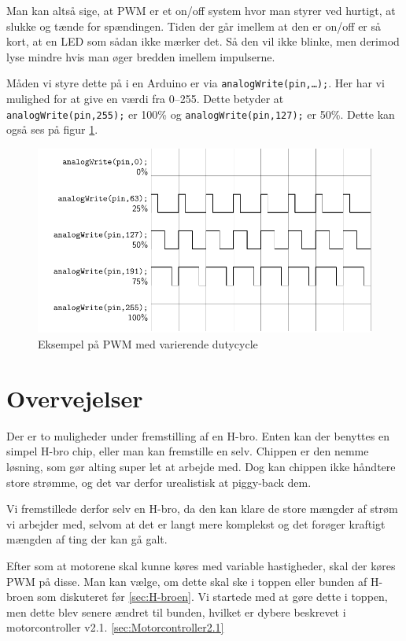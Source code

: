 \documentclass[a4paper,oneside,article,danish,table]{memoir}
\begin{document}
Man kan altså sige, at PWM er et on/off system hvor man styrer ved hurtigt, at slukke og tænde for
spændingen. Tiden der går imellem at den er on/off er så kort, at en LED som sådan ikke mærker det. Så
den vil ikke blinke, men derimod lyse mindre hvis man øger bredden imellem impulserne.

Måden vi styre dette på i en Arduino er via \texttt{analogWrite(pin,\dots);}. Her har vi mulighed for at give en værdi fra 0--255. Dette betyder at \texttt{analogWrite(pin,255);} er 100\% og \texttt{analogWrite(pin,127);} er 50\%. Dette kan også ses på figur \ref{fig:pwm}.
\begin{figure}[htbp]
  \centering
  \includegraphics[width=\textwidth]{pictures/pwm.pdf}
  \caption{Eksempel på PWM med varierende dutycycle}
  \label{fig:pwm}
\end{figure}

\section{Overvejelser}
Der er to muligheder under fremstilling af en H-bro. Enten kan der benyttes en simpel H-bro chip, eller man kan fremstille en selv. Chippen er den nemme løsning, som gør alting super let at arbejde med. Dog kan chippen ikke håndtere store strømme, og det var derfor urealistisk at piggy-back dem.

Vi fremstillede derfor selv en H-bro, da den kan klare de store mængder af strøm vi arbejder med, selvom at det er langt mere komplekst og det forøger kraftigt mængden af ting der kan gå galt.

Efter som at motorene skal kunne køres med variable hastigheder, skal der køres PWM på disse. Man kan vælge, om dette skal ske i toppen eller bunden af H-broen som diskuteret før \ref{sec:H-broen}. Vi startede med at gøre dette i toppen, men dette blev senere ændret til bunden, hvilket er dybere beskrevet i motorcontroller v2.1. \ref{sec:Motorcontroller2.1}
\end{document}
